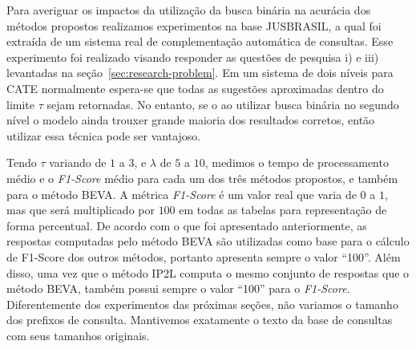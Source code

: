 Para averiguar os impactos da utilização da busca binária na acurácia dos métodos propostos realizamos experimentos na base JUSBRASIL, a qual foi extraída de um sistema real de complementação automática de consultas. Esse experimento foi realizado visando responder as questões de pesquisa i) e iii) levantadas na seção~\ref{sec:research-problem}. Em um sistema de dois níveis para CATE normalmente espera-se que todas as sugestões aproximadas dentro do limite $\tau$ sejam retornadas. No entanto, se o ao utilizar busca binária no segundo nível o modelo ainda trouxer grande maioria dos resultados corretos, então utilizar essa técnica pode ser vantajoso.

Tendo $\tau$ variando de $1$ a $3$, e $\lambda$ de $5$ a $10$, medimos o tempo de processamento médio e o \textit{F1-Score} médio para cada um dos três métodos propostos, e também para o método BEVA. A métrica \textit{F1-Score} é um valor real que varia de $0$ a $1$, mas que será multiplicado por $100$ em todas as tabelas para representação de forma percentual. De acordo com o que foi apresentado anteriormente, as respostas computadas pelo método BEVA são utilizadas como base para o cálculo de F1-Score dos outros métodos, portanto apresenta sempre o valor ``100''. Além disso, uma vez que o método IP2L computa o mesmo conjunto de respostas que o método BEVA, também possui sempre o valor ``100'' para o \textit{F1-Score}. Diferentemente dos experimentos das próximas seções, não variamos o tamanho dos prefixos de consulta. Mantivemos exatamente o texto da base de consultas com seus tamanhos originais.


